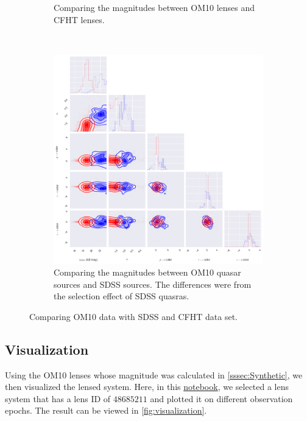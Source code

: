 \documentclass[\docopts]{\docclass}
\begin{document}
\begin{figure}
\begin{subfigure}[b]{0.3\textwidth}
        \caption{Comparing the magnitudes between OM10 lenses and CFHT lenses.}
        \label{fig:lens_cfht}
    \end{subfigure}
    ~ %
    \begin{subfigure}[b]{0.3\textwidth}
        \includegraphics[width=\textwidth]{quasar_sdss.png}
        \caption{Comparing the magnitudes between OM10 quasar sources and SDSS sources. The differences were from the selection effect of SDSS quasras.}
        \label{fig:quasar_sdss}
    \end{subfigure}
    \caption{Comparing OM10 data with SDSS and CFHT data set. }\label{fig:comparison}
\end{figure}

\subsection{Visualization}

Using the OM10 lenses whose magnitude was calculated in
\ref{sssec:Synthetic}, we then visualized the lensed system. Here, in this \href{https://github.com/drphilmarshall/OM10/blob/master/notebooks/Color%20Comparison.ipynb}{notebook}, we selected a lens system that has a lens ID of $48685211$ and plotted it on different observation epochs. The result can be viewed in \ref{fig:visualization}.
\end{document}
